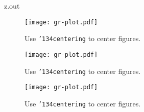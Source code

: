\begin{VerbatimOut}{z.out}
\begin{figure}[ht]
  \centering
  \texttt{[image: gr-plot.pdf]}
  \caption{Use {\tt \char'134centering\/} to center figures.}
  \label{fi:centered}
\end{figure}

\begin{figure}[ht]
  \centering
  \texttt{[image: gr-plot.pdf]}
  \caption{Use {\tt \char'134centering\/} to center figures.}
  \label{fi:centered}
\end{figure}

\begin{figure}[ht]
  \centering
  \texttt{[image: gr-plot.pdf]}
  \caption{Use {\tt \char'134centering\/} to center figures.}
  \label{fi:centered}
\end{figure}
\end{VerbatimOut}

\MyIO

